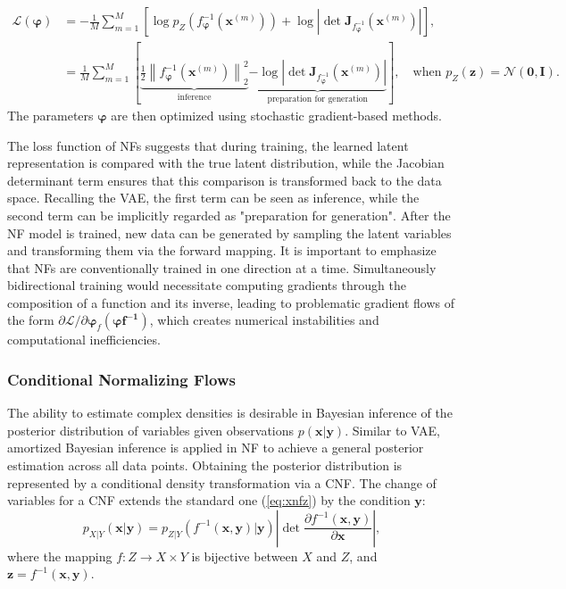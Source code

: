 \begin{align}
\label{eq:kl_nf}
\mathcal{L}(\boldsymbol{\varphi}) &= - \frac{1}{M}\sum_{m=1}^{M} \left[ \log p_{Z}(f_{\boldsymbol{\varphi}}^{-1}(\boldsymbol{x}^{(m)})) + \log \left| \det \boldsymbol{J}_{f_{\boldsymbol{\varphi}}^{-1}}(\boldsymbol{x}^{(m)}) \right| \right], \nonumber\\
&= \frac{1}{M}\sum_{m=1}^{M} \left[ \underbrace{\frac{1}{2}\left\|f_{\boldsymbol{\varphi}}^{-1}(\boldsymbol{x}^{(m)})\right\|^2_2}_{\text{inference}} \underbrace{- \log \left| \det \boldsymbol{J}_{f_{\boldsymbol{\varphi}}^{-1}}(\boldsymbol{x}^{(m)}) \right|}_{\text{preparation for generation}} \right], \quad \text{when } p_Z(\boldsymbol{z})=\mathcal{N}(\boldsymbol{0},\boldsymbol{I}).
\end{align}
The parameters $\boldsymbol{\varphi}$ are then optimized using stochastic gradient-based methods.

The loss function of \acp{NF} suggests that during training, the learned latent representation is compared with the true latent distribution, while the Jacobian determinant term ensures that this comparison is transformed back to the data space. Recalling the \ac{VAE}, the first term can be seen as inference, while the second term can be implicitly regarded as "preparation for generation". After the \ac{NF} model is trained, new data can be generated by sampling the latent variables and transforming them via the forward mapping. It is important to emphasize that \acp{NF} are conventionally trained in one direction at a time. Simultaneously bidirectional training would necessitate computing gradients through the composition of a function and its inverse, leading to problematic gradient flows of the form $\partial \mathcal{L}/\partial \boldsymbol{\varphi}_f(\boldsymbol{\varphi{f^{-1}}})$, which creates numerical instabilities and computational inefficiencies.

\subsubsection{Conditional Normalizing Flows}
\label{sec:condnf}
The ability to estimate complex densities is desirable in Bayesian inference of the posterior distribution of variables given observations $p(\boldsymbol{x}|\boldsymbol{y})$. Similar to \ac{VAE}, amortized Bayesian inference \citep{radev2021diss} is applied in \ac{NF} to achieve a general posterior estimation across all data points. Obtaining the posterior distribution is represented by a conditional density transformation via a \ac{CNF}. The change of variables for a \ac{CNF} extends the standard one (\ref{eq:xnfz}) by the condition $\boldsymbol{y}$:
\begin{equation}
    p_{X|Y}(\boldsymbol{x}|\boldsymbol{y}) = p_{Z|Y}(f^{-1}(\boldsymbol{x},\boldsymbol{y})|\boldsymbol{y})\left|\det\frac{\partial f^{-1}(\boldsymbol{x},\boldsymbol{y})}{\partial\boldsymbol{x}}\right|,
\end{equation}
where the mapping $f:Z\rightarrow X\times Y$ is bijective between $X$ and $Z$, and $\boldsymbol{z}=f^{-1}(\boldsymbol{x},\boldsymbol{y})$.

